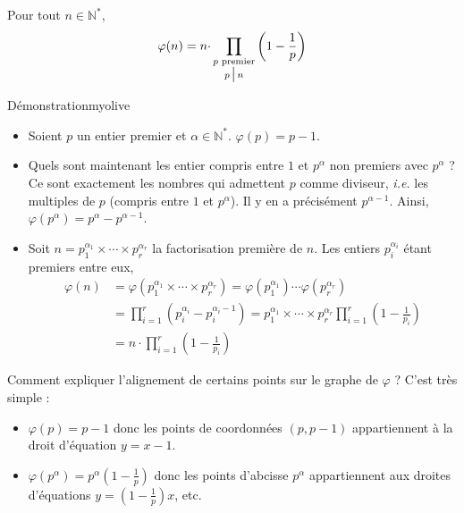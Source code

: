     \begin{prop}{}{}
        Pour tout $n \in \mathbb{N}^*$, 
        \[ \varphi(n) = n \cdotp \prod_{\substack{p \text{ premier} \\ p \, \big| \, n}} \left(1 -  \frac{1}{p}\right) \]   
    \end{prop}

    \begin{demo}{Démonstration}{myolive}
        \begin{itemize}
            \item Soient $p$ un entier premier et $\alpha \in \mathbb{N}^*$. $\varphi(p) = p-1$.
            \item Quels sont maintenant les entier compris entre $1$ et $p^{\alpha}$ non premiers avec $p^{\alpha}$ ? Ce sont exactement les nombres qui admettent $p$ comme diviseur, \textit{i.e.} les multiples de $p$ (compris entre $1$ et $p^{\alpha}$). Il y en a précisément $p^{\alpha - 1}$. Ainsi, $\varphi(p^{\alpha}) = p^{\alpha} - p^{\alpha - 1}$.
            \item Soit $n = p_1^{\alpha_1} \times \cdots \times p_r^{\alpha_r}$ la factorisation première de $n$. Les entiers $p_i^{\alpha_i}$ étant premiers entre eux, 
            \begin{align*}
                \varphi(n) 
                &= \varphi\left(p_1^{\alpha_1} \times \cdots \times p_r^{\alpha_r}\right) = \varphi(p_1^{\alpha_1})\cdots \varphi(p_r^{\alpha_r}) \\
                &= \prod_{i=1}^r \left(p_i^{\alpha_i} - p_i^{\alpha_i - 1}\right) = p_1^{\alpha_1} \times \cdots \times p_r^{\alpha_r} \prod_{i=1}^r \left(1 - \frac{1}{p_i}\right) \\
                &= n \cdotp \prod_{i = 1}^r \left(1 -  \frac{1}{p_i}\right)
            \end{align*}
        \end{itemize}
    \end{demo}

    Comment expliquer l’alignement de certains points sur le graphe de $\varphi$ ? C’est très simple :
    \begin{itemize}
        \item $\varphi(p) = p-1$ donc les points de coordonnées $(p,p-1)$ appartiennent à la droit d’équation $y = x-1$.
        \item $\varphi(p^{\alpha}) = p^{\alpha}\left(1 - \frac{1}{p}\right)$ donc les points d’abcisse $p^{\alpha}$ appartiennent aux droites d’équations $y = \left(1 - \frac{1}{p}\right)x$, etc.
    \end{itemize}

